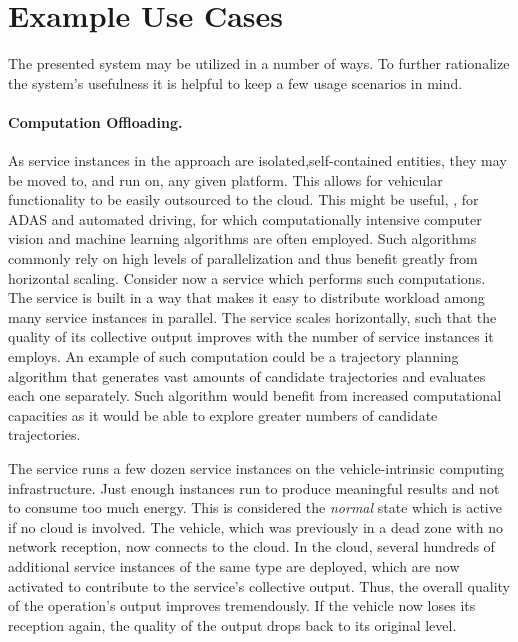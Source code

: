 \section{Example Use Cases} \label{sec:usecases}
The presented system may be utilized in a number of ways. To further rationalize the system's usefulness it is helpful to keep a few usage scenarios in mind.

\paragraph{Computation Offloading.}
As service instances in the approach are isolated,\linebreak self-contained entities, they may be moved to, and run on, any given platform. This allows for vehicular functionality to be easily outsourced to the cloud. This might be useful, \eg , for ADAS and automated driving, for which computationally intensive computer vision and machine learning algorithms are often employed. Such algorithms commonly rely on high levels of parallelization and thus benefit greatly from horizontal scaling. Consider now a service which performs such computations. The service is built in a way that makes it easy to distribute workload among many service instances in parallel. The service scales horizontally, such that the quality of its collective output improves with the number of service instances it employs. An example of such computation could be a trajectory planning algorithm that generates vast amounts of candidate trajectories and evaluates each one separately. Such algorithm would benefit from increased computational capacities as it would be able to explore greater numbers of candidate trajectories.

The service runs a few dozen service instances on the vehicle-intrinsic computing infrastructure. Just enough instances run to produce meaningful results and not to consume too much energy. This is considered the \emph{normal} state which is active if no cloud is involved. The vehicle, which was previously in a dead zone with no network reception, now connects to the cloud. In the cloud, several hundreds of additional service instances of the same type are deployed, which are now activated to contribute to the service's collective output. Thus, the overall quality of the operation's output improves tremendously. If the vehicle now loses its reception again, the quality of the output drops back to its original level.

